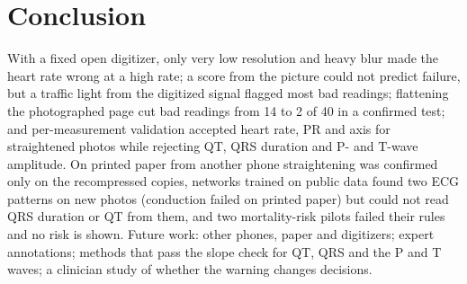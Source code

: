 \documentclass[conference]{IEEEtran}
\begin{document}
\section{Conclusion}
With a fixed open digitizer, only very low resolution and heavy blur made the heart rate wrong at a high rate; a score from the picture could not predict failure, but a traffic light from the digitized signal flagged most bad readings; flattening the photographed page cut bad readings from 14 to 2 of 40 in a confirmed test; and per-measurement validation accepted heart rate, PR and axis for straightened photos while rejecting QT, QRS duration and P- and T-wave amplitude. On printed paper from another phone straightening was confirmed only on the recompressed copies, networks trained on public data found two ECG patterns on new photos (conduction failed on printed paper) but could not read QRS duration or QT from them, and two mortality-risk pilots failed their rules and no risk is shown. Future work: other phones, paper and digitizers; expert annotations; methods that pass the slope check for QT, QRS and the P and T waves; a clinician study of whether the warning changes decisions.



\end{document}

